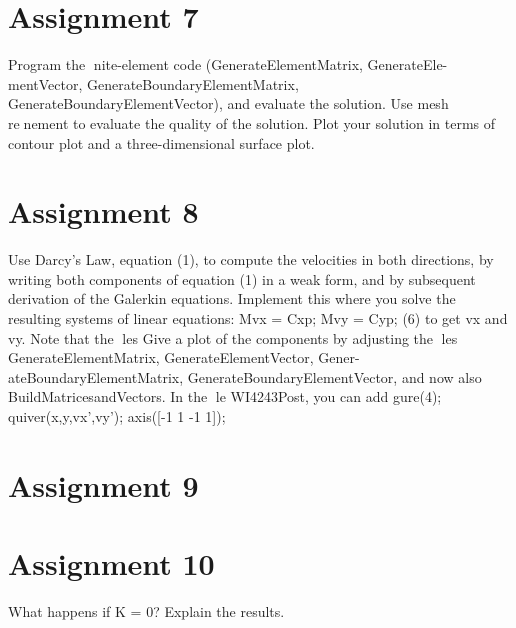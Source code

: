 \documentclass{report}
\begin{document}
\section{Assignment 7}
Program the nite-element code (GenerateElementMatrix, GenerateEle-mentVector, GenerateBoundaryElementMatrix, GenerateBoundaryElementVector), and evaluate the solution. Use mesh renement to evaluate the quality of the solution. Plot your solution in terms of contour plot and a three-dimensional surface plot.


\section{Assignment 8}

Use Darcy's Law, equation (1), to compute the velocities in both directions, by writing both components of equation (1) in a weak form, and by
subsequent derivation of the Galerkin equations. Implement this where you solve the resulting systems of linear equations:
Mvx = Cxp; Mvy = Cyp; (6)
to get vx and vy. Note that the les Give a plot of the components by adjusting the les GenerateElementMatrix, GenerateElementVector, Gener-
ateBoundaryElementMatrix, GenerateBoundaryElementVector, and now also BuildMatricesandVectors. In the le WI4243Post, you can add gure(4); quiver(x,y,vx',vy'); axis([-1 1 -1 1]);

\section{Assignment 9}


\section{Assignment 10}
What happens if K = 0? Explain the results.
\end{document}
